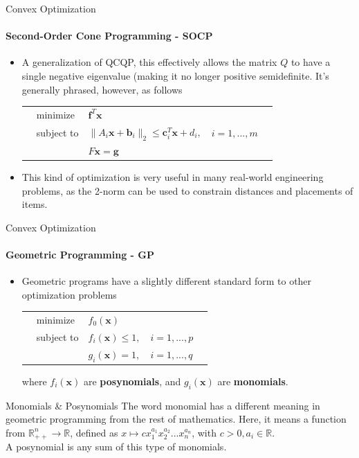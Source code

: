 \documentclass{beamer}
\renewcommand{\vec}{\mathbf}
\begin{document}
	\begin{frame}{Convex Optimization}
		\framesubtitle{Second-Order Cone Programming - SOCP}
		\begin{itemize}
			\item A generalization of QCQP, this effectively allows the matrix $Q$ to have a single negative eigenvalue (making it no longer positive semidefinite. It's generally phrased, however, as follows
			\begin{tabularx}{\textwidth}{X l l l X}
				& minimize		& $\vec{f}^T\vec{x}$	& &\\
				& subject to	& $\lVert A_i\vec{x} + \vec{b}_i\rVert_2\leq\vec{c}_i^T\vec{x} + d_i,$	& $i=1,...,m$ &\\
				&				& $F\vec{x} = \vec{g}$ & &
			\end{tabularx}
			\item This kind of optimization is very useful in many real-world engineering problems, as the 2-norm can be used to constrain distances and placements of items.  
		\end{itemize}
	\end{frame}
	
	\begin{frame}{Convex Optimization}
		\framesubtitle{Geometric Programming - GP}
		\begin{itemize}
			\item Geometric programs have a slightly different standard form to other optimization problems
			\begin{tabularx}{\textwidth}{X l l l X}
				& minimize		& $f_0(\vec{x})$	& &\\
				& subject to	& $f_i(\vec{x}) \leq 1,$	& $i=1,...,p$ &\\
				&				& $g_i(\vec{x}) = 1,$ & $i=1,...,q$ &
			\end{tabularx}
			where $f_i(\vec{x})$ are \textbf{posynomials}, and $g_i(\vec{x})$ are \textbf{monomials}.
		\end{itemize}
		\begin{block}{Monomials \& Posynomials}
			The word monomial has a different meaning in geometric programming from the rest of mathematics. Here, it means a function from $\mathbb{R}_{++}^n\to\mathbb{R}$, defined as $x\mapsto cx_1^{a_1}x_2^{a_2}...x_n^{a_n}$, with $c>0, a_i\in\mathbb{R}$.\\
			A posynomial is any sum of this type of monomials.
		\end{block}
	\end{frame}
	
\end{document}
